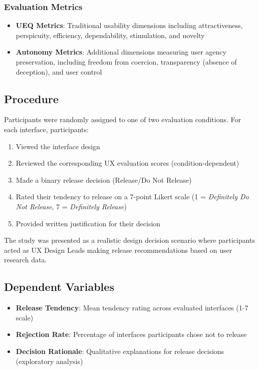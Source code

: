 \subsubsection{Evaluation Metrics}
\begin{itemize}
    \item \textbf{UEQ Metrics}: Traditional usability dimensions including attractiveness, perspicuity, efficiency, dependability, stimulation, and novelty
    \item \textbf{Autonomy Metrics}: Additional dimensions measuring user agency preservation, including freedom from coercion, transparency (absence of deception), and user control
\end{itemize}

\subsection{Procedure}
Participants were randomly assigned to one of two evaluation conditions. For each interface, participants:
\begin{enumerate}
    \item Viewed the interface design
    \item Reviewed the corresponding UX evaluation scores (condition-dependent)
    \item Made a binary release decision (Release/Do Not Release)
    \item Rated their tendency to release on a 7-point Likert scale (1 = \textit{Definitely Do Not Release}, 7 = \textit{Definitely Release})
    \item Provided written justification for their decision
\end{enumerate}

The study was presented as a realistic design decision scenario where participants acted as UX Design Leads making release recommendations based on user research data.

\subsection{Dependent Variables}
\begin{itemize}
    \item \textbf{Release Tendency}: Mean tendency rating across evaluated interfaces (1-7 scale)
    \item \textbf{Rejection Rate}: Percentage of interfaces participants chose not to release
    \item \textbf{Decision Rationale}: Qualitative explanations for release decisions (exploratory analysis)
\end{itemize}

